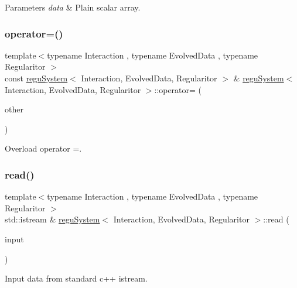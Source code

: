 \begin{DoxyParams}{Parameters}
{\em data} & Plain scalar array. \\
\hline
\end{DoxyParams}
\mbox{\label{classregu_system_a894081d40cb90418f791ab52e3c64d5f}} 
\subsubsection{\texorpdfstring{operator=()}{operator=()}}
{\footnotesize\ttfamily template$<$typename Interaction , typename Evolved\+Data , typename Regularitor $>$ \\
const \mbox{\hyperlink{classregu_system}{regu\+System}}$<$ Interaction, Evolved\+Data, Regularitor $>$ \& \mbox{\hyperlink{classregu_system}{regu\+System}}$<$ Interaction, Evolved\+Data, Regularitor $>$\+::operator= (\begin{DoxyParamCaption}\item[{const \mbox{\hyperlink{classregu_system}{regu\+System}}$<$ Interaction, Evolved\+Data, Regularitor $>$ \&}]{other }\end{DoxyParamCaption})}



Overload operator =. 

\mbox{\label{classregu_system_ae26daf3f6058c1be67fb00366706e2e4}} 
\subsubsection{\texorpdfstring{read()}{read()}}
{\footnotesize\ttfamily template$<$typename Interaction , typename Evolved\+Data , typename Regularitor $>$ \\
std\+::istream \& \mbox{\hyperlink{classregu_system}{regu\+System}}$<$ Interaction, Evolved\+Data, Regularitor $>$\+::read (\begin{DoxyParamCaption}\item[{std\+::istream \&}]{input }\end{DoxyParamCaption})}



Input data from standard c++ istream. 

